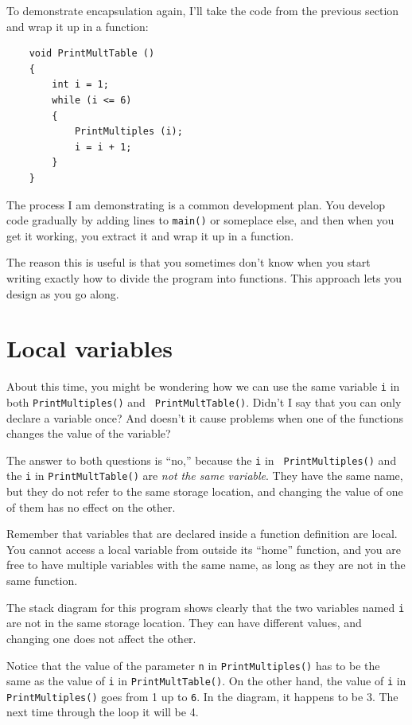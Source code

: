 To demonstrate encapsulation again, I'll take the code
from the previous section and wrap it up in a function:

\begin{verbatim}
    void PrintMultTable () 
    {
        int i = 1;
        while (i <= 6) 
        {
            PrintMultiples (i);
            i = i + 1;
        }
    }
\end{verbatim}
%
The process I am demonstrating is a common 
development plan.  You develop code gradually by adding
lines to {\tt main()} or someplace else, and then when you get
it working, you extract it and wrap it up in a function.

The reason this is useful is that you sometimes don't know
when you start writing exactly how to divide the program into
functions.  This approach lets you design as you go along.

\section{Local variables}

About this time, you might be wondering how we can use the same
variable {\tt i} in both {\tt PrintMultiples()} and {\tt
PrintMultTable()}.  Didn't I say that you can only declare a variable
once?  And doesn't it cause problems when one of the functions changes
the value of the variable?

The answer to both questions is ``no,'' because the {\tt i} in {\tt
PrintMultiples()} and the {\tt i} in {\tt PrintMultTable()} are
{\em not the same variable}.  They have the same name, but
they do not refer to the same storage location, and changing
the value of one of them has no effect on the other.


Remember that variables that are declared inside a function definition
are local.  You cannot access a local variable from outside its
``home'' function, and you are free to have multiple variables with
the same name, as long as they are not in the same function.

The stack diagram for this program shows clearly that the
two variables named {\tt i} are not in the same storage location.
They can have different values, and changing one does not affect
the other.


\vspace{0.1in}
\centerline{}
\vspace{0.1in}
%
Notice that the value of the parameter {\tt n} in
{\tt PrintMultiples()} has to be the same as the value
of {\tt i} in {\tt PrintMultTable()}.  On the other hand,
the value of {\tt i} in {\tt PrintMultiples()} goes
from 1 up to {\tt 6}.  In the diagram, it happens to be 3.
The next time through the loop it will be 4.

